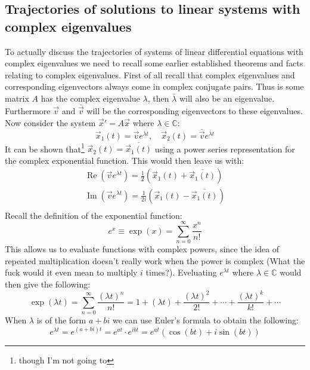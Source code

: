 \documentclass[11pt, a4paper]{article}
\newcommand*{\C}{\ensuremath{\mathbb{C}}}
\renewcommand*{\Re}{\operatorname{Re}}
\renewcommand*{\Im}{\operatorname{Im}}
\begin{document}
\subsection{Trajectories of solutions to linear systems with complex eigenvalues}
To actually discuss the trajectories of systems of linear differential equations with complex eigenvalues we need to recall some earlier established theorems and facts relating to complex eigenvalues. First of all recall that complex eigenvalues and corresponding eigenvectors always come in complex conjugate pairs. Thus is some matrix $A$ has the complex eigenvalue $\lambda$, then $\bar{\lambda}$ will also be an eigenvalue. Furthermore $\vec{v}$ and $\bar{\vec{v}}$ will be the corresponding eigenvectors to these eigenvalues. Now consider the system $\vec{x}' = A\vec{x}$ where $\lambda \in \C$:
\begin{equation*}
  \vec{x}_1(t) = \vec{v}e^{\lambda t}, \quad \vec{x}_2(t) = \bar{\vec{v}}e^{\bar{\lambda} t}
\end{equation*}
It can be shown that\footnote{though I'm not going to} $\vec{x}_2(t) = \overline{\vec{x}_1(t)}$ using a power series representation for the complex exponential function. This would then leave us with:
\begin{gather*}
  \Re(\vec{v}e^{\lambda t}) = \frac{1}{2}\left(\vec{x}_1(t) + \overline{\vec{x}_1(t)}\right)\\
  \Im(\vec{v}e^{\lambda t}) = \frac{1}{2i}\left(\vec{x}_1(t) - \overline{\vec{x}_1(t)}\right)\\
\end{gather*}
Recall the definition of the exponential function:
\begin{equation*}
  e^{x} \equiv \exp(x) = \sum_{n=0}^{\infty} \frac{x^{n}}{n!}
\end{equation*}
This allows us to evaluate functions with complex powers, since the idea of repeated multiplication doesn't really work when the power is complex (What the fuck would it even mean to multiply $i$ times?). Eveluating $e^{\lambda t}$ where $\lambda \in \C$ would then give the following:
\begin{equation*}
  \exp(\lambda t) = \sum_{n=0}^{\infty} \frac{(\lambda t)^n}{n!} = 1 + (\lambda t) + \frac{(\lambda t)^2}{2!} + \cdots + \frac{(\lambda t)^k}{k!} + \cdots
\end{equation*}
When $\lambda$ is of the form $a+bi$ we can use Euler's formula to obtain the following:
\begin{equation*}
  e^{\lambda t} = e^{(a+bi)t} = e^{at}\cdot e^{ibt} = e^{at} (\cos(bt) + i\sin(bt))
\end{equation*}
\end{document}
